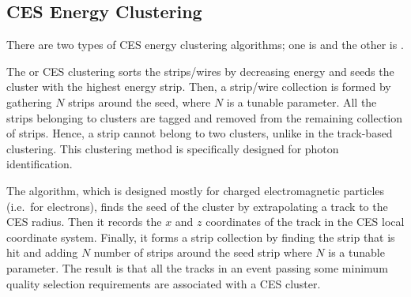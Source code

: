 \subsection{CES Energy Clustering}
There are two types of CES energy clustering algorithms; one is  and the other is .

The  or  CES clustering sorts the strips/wires by decreasing energy and seeds the cluster with the highest energy strip. Then, a strip/wire collection is formed by gathering $N$ strips around the seed, where $N$ is a tunable parameter. All the strips belonging to clusters are tagged and removed from the remaining collection of strips. Hence, a strip cannot belong to two clusters, unlike in the track-based clustering. This clustering method is specifically designed for photon identification.

The  algorithm, which is designed mostly for charged electromagnetic particles (i.e.~for electrons), finds the seed of the cluster by extrapolating a track to the CES radius. Then it records the $x$ and $z$ coordinates of the track in the CES local coordinate system. Finally, it forms a strip collection by finding the strip that is hit and adding $N$ number of strips around the seed strip where $N$ is a tunable parameter. The result is that all the tracks in an event passing some minimum quality selection requirements are associated with a CES cluster.

